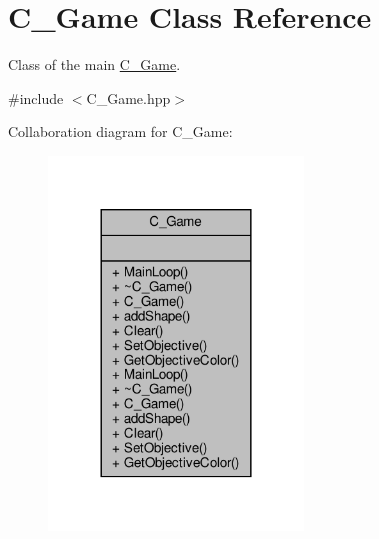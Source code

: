 \hypertarget{classC__Game}{}\section{C\+\_\+\+Game Class Reference}
\label{classC__Game}


Class of the main \hyperlink{classC__Game}{C\+\_\+\+Game}.  




{\ttfamily \#include $<$C\+\_\+\+Game.\+hpp$>$}



Collaboration diagram for C\+\_\+\+Game\+:\nopagebreak
\begin{figure}[H]
\begin{center}
\leavevmode
\includegraphics[width=192pt]{classC__Game__coll__graph}
\end{center}
\end{figure}
